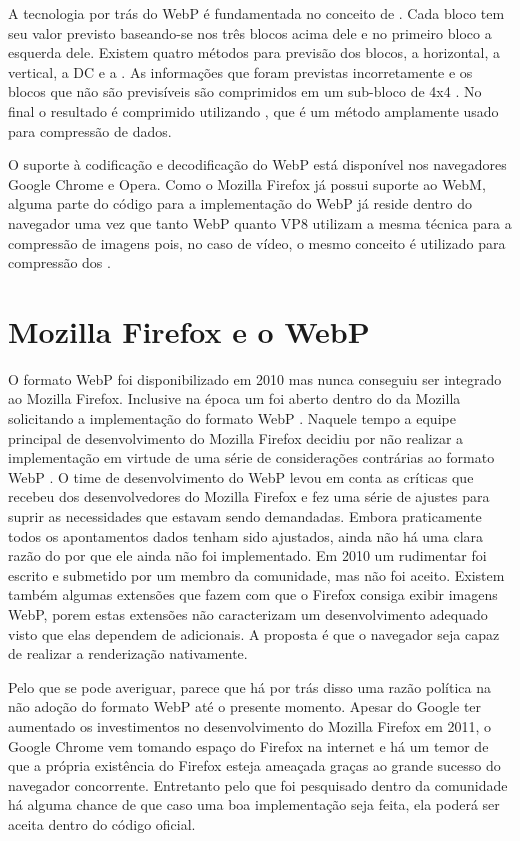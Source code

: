 \documentclass[espaco=simples,appendix=Name]{abnt}
\begin{document}
A tecnologia por trás do WebP é fundamentada no conceito de . Cada bloco tem seu valor previsto baseando-se nos três blocos acima dele e no primeiro bloco a esquerda dele. Existem quatro métodos para previsão dos blocos, a horizontal, a vertical, a DC e a . As informações que foram previstas incorretamente e os blocos que não são previsíveis são comprimidos em um sub-bloco de 4x4 . No final o resultado é comprimido utilizando , que é um método  amplamente usado para compressão de dados.

O suporte à codificação e decodificação do WebP está disponível nos navegadores Google Chrome e Opera. Como o Mozilla Firefox já possui suporte ao WebM, alguma parte do código para a implementação do WebP já reside dentro do navegador uma vez que tanto WebP quanto VP8 utilizam a mesma técnica para a compressão de imagens pois, no caso de vídeo, o mesmo conceito é utilizado para compressão dos .

\section{Mozilla Firefox e o WebP}

O formato WebP foi disponibilizado em 2010 mas nunca conseguiu ser integrado ao Mozilla Firefox. Inclusive na época um  foi aberto dentro do  da Mozilla solicitando a implementação do formato WebP \cite{FirefoxBug}. Naquele tempo a equipe principal de desenvolvimento do Mozilla Firefox decidiu por não realizar a implementação em virtude de uma série de considerações contrárias ao formato WebP \cite{WebPCritica}. O time de desenvolvimento do WebP levou em conta as críticas que recebeu dos desenvolvedores do Mozilla Firefox e fez uma série de ajustes para suprir as necessidades que estavam sendo demandadas. Embora praticamente todos os apontamentos dados tenham sido ajustados, ainda não há uma clara razão do por que ele ainda não foi implementado. Em 2010 um  rudimentar foi escrito e submetido por um membro da comunidade, mas não foi aceito. Existem também algumas extensões que fazem com que o Firefox consiga exibir imagens WebP, porem estas extensões não caracterizam um desenvolvimento adequado visto que elas dependem de  adicionais. A proposta é que o navegador seja capaz de realizar a renderização nativamente.

Pelo que se pode averiguar, parece que há por trás disso uma razão política na não adoção do formato WebP até o presente momento. Apesar do Google ter aumentado os investimentos no desenvolvimento do Mozilla Firefox em 2011, o Google Chrome vem tomando espaço do Firefox na internet e há um temor de que a própria existência do Firefox esteja ameaçada graças ao grande sucesso do navegador concorrente. Entretanto pelo que foi pesquisado dentro da comunidade há alguma chance de que caso uma boa implementação seja feita, ela poderá ser aceita dentro do código oficial.
\end{document}
